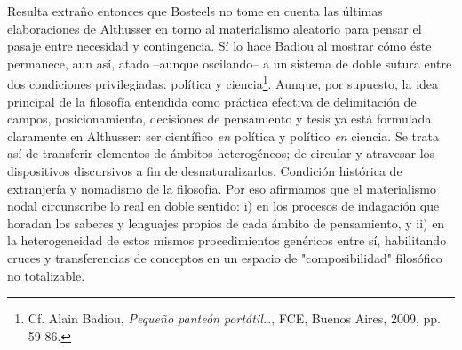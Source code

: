 Resulta extraño entonces que Bosteels no tome en cuenta las últimas
elaboraciones de Althusser en torno al materialismo aleatorio para
pensar el pasaje entre necesidad y contingencia. Sí lo hace Badiou al
mostrar cómo éste permanece, aun así, atado --aunque oscilando-- a un
sistema de doble sutura entre dos condiciones privilegiadas: política y
ciencia\footnote{Cf. Alain Badiou, \emph{Pequeño panteón
  portátil\ldots{}}, FCE, Buenos Aires, 2009, pp. 59-86.}. Aunque, por
supuesto, la idea principal de la filosofía entendida como práctica
efectiva de delimitación de campos, posicionamiento, decisiones de
pensamiento y tesis ya está formulada claramente en Althusser: ser
científico \emph{en} política y político \emph{en} ciencia. Se trata así
de transferir elementos de ámbitos heterogéneos; de circular y atravesar
los dispositivos discursivos a fin de desnaturalizarlos. Condición
histórica de extranjería y nomadismo de la filosofía. Por eso afirmamos
que el materialismo nodal circunscribe lo real en doble sentido: i) en
los procesos de indagación que horadan los saberes y lenguajes propios
de cada ámbito de pensamiento, y ii) en la heterogeneidad de estos
mismos procedimientos genéricos entre sí, habilitando cruces y
transferencias de conceptos en un espacio de "composibilidad" filosófico
no totalizable.

